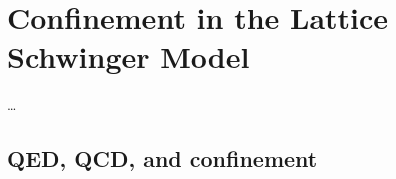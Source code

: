\documentclass[../main.tex]{subfiles} %
\begin{document}
\chapter{Confinement in the Lattice Schwinger Model} \label{chap:Confinement}

\ldots



\section{QED, QCD, and confinement} \label{sec:Confinement}

\lipsum[1-3]


\end{document}
